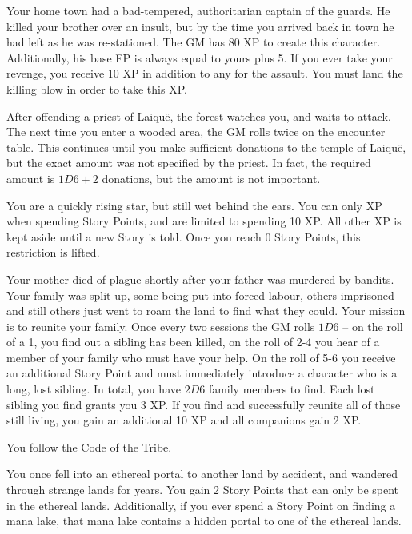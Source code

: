 \begin{multicols}{2}
\begin{list}{\addtocounter{list}{1}\textbf{:}}{\raggedleft}
	\item
	Your home town had a bad-tempered, authoritarian captain of the guards.
He killed your brother over an insult, but by the time you arrived back in town he had left as he was re-stationed.
The GM has 80 XP to create this character.
Additionally, his base FP is always equal to yours plus 5.
If you ever take your revenge, you receive 10 XP in addition to any for the assault.
You must land the killing blow in order to take this XP.
	\item{After offending a priest of Laiqu\"{e}, the forest watches you, and waits to attack.
	The next time you enter a wooded area, the GM rolls twice on the encounter table.
	This continues until you make sufficient donations to the temple of Laiqu\"e, but the exact amount was not specified by the priest.
	In fact, the required amount is $1D6 + 2$ donations, but the amount is not important.
	}

	\item
	You are a quickly rising star, but still wet behind the ears.
	You can only XP when spending Story Points, and are limited to spending 10 XP.
	All other XP is kept aside until a new Story is told.
	Once you reach 0 Story Points, this restriction is lifted.
	
	\item
	Your mother died of plague shortly after your father was murdered by bandits.
	Your family was split up, some being put into forced labour, others imprisoned and still others just went to roam the land to find what they could.
	Your mission is to reunite your family.
	Once every two sessions the GM rolls $1D6$ -- on the roll of a 1, you find out a sibling has been killed, on the roll of 2-4 you hear of a member of your family who must have your help.
	On the roll of 5-6 you receive an additional Story Point and must immediately introduce a character who is a long, lost sibling.
	In total, you have $2D6$ family members to find.
	Each lost sibling you find grants you 3 XP.
	If you find and successfully reunite all of those still living, you gain an additional 10 XP and all companions gain 2 XP.
	
	You follow the Code of the Tribe.

	\item
	You once fell into an ethereal portal to another land by accident, and wandered through strange lands for years.  You gain 2 Story Points that can only be spent in the ethereal lands.  Additionally, if you ever spend a Story Point on finding a mana lake, that mana lake contains a hidden portal to one of the ethereal lands.


\end{list}
\end{multicols}
